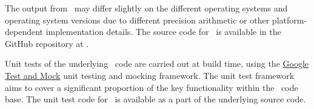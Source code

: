 The output from \CNAME\ may differ slightly on the different operating systems and operating system versions due to different precision arithmetic or other platform-dependent implementation details. The source code for \CNAME\ is available in the GitHub repository at \github.

Unit tests of the underlying \CNAME\ code are carried out at build time, using the \href{https://github.com/google/googletest}{Google Test and Mock} unit testing and mocking framework. The unit test framework aims to cover a significant proportion of the key functionality within the \CNAME\ code base. The unit test code for \CNAME\ is available as a part of the underlying source code.

